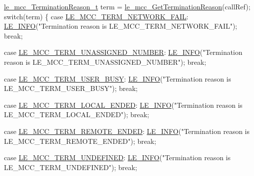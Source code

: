 \begin{DoxyCodeInclude}
{{{{{{{{{{        \hyperlink{le__mcc__interface_8h_abda706f723ba619f9bc460bcc9a4960d}{le\_mcc\_TerminationReason\_t} term = 
      \hyperlink{le__mcc__interface_8h_ab16921abc02e0569b129f4a7d92bf3c9}{le\_mcc\_GetTerminationReason}(callRef);
        \textcolor{keywordflow}{switch}(term)
        \{
            \textcolor{keywordflow}{case} \hyperlink{le__mcc__interface_8h_abda706f723ba619f9bc460bcc9a4960da2ef2a4a77e51faec38a2c131ff5d6f24}{LE\_MCC\_TERM\_NETWORK\_FAIL}:
                \hyperlink{le__log_8h_a23e6d206faa64f612045d688cdde5808}{LE\_INFO}(\textcolor{stringliteral}{"Termination reason is LE\_MCC\_TERM\_NETWORK\_FAIL"});
                \textcolor{keywordflow}{break};

            \textcolor{keywordflow}{case} \hyperlink{le__mcc__interface_8h_abda706f723ba619f9bc460bcc9a4960da2efa341f50cb8abef243d8ea2b9fac7d}{LE\_MCC\_TERM\_UNASSIGNED\_NUMBER}:
                \hyperlink{le__log_8h_a23e6d206faa64f612045d688cdde5808}{LE\_INFO}(\textcolor{stringliteral}{"Termination reason is LE\_MCC\_TERM\_UNASSIGNED\_NUMBER"});
                \textcolor{keywordflow}{break};

            \textcolor{keywordflow}{case} \hyperlink{le__mcc__interface_8h_abda706f723ba619f9bc460bcc9a4960dad7664d1f5a0c6517861637d0a083020c}{LE\_MCC\_TERM\_USER\_BUSY}:
                \hyperlink{le__log_8h_a23e6d206faa64f612045d688cdde5808}{LE\_INFO}(\textcolor{stringliteral}{"Termination reason is LE\_MCC\_TERM\_USER\_BUSY"});
                \textcolor{keywordflow}{break};

            \textcolor{keywordflow}{case} \hyperlink{le__mcc__interface_8h_abda706f723ba619f9bc460bcc9a4960daf4262288191582892e6f84e51e3082c1}{LE\_MCC\_TERM\_LOCAL\_ENDED}:
                \hyperlink{le__log_8h_a23e6d206faa64f612045d688cdde5808}{LE\_INFO}(\textcolor{stringliteral}{"Termination reason is LE\_MCC\_TERM\_LOCAL\_ENDED"});
                \textcolor{keywordflow}{break};

            \textcolor{keywordflow}{case} \hyperlink{le__mcc__interface_8h_abda706f723ba619f9bc460bcc9a4960dad33c3e71bdfd7513392f28bf2a7e9c9b}{LE\_MCC\_TERM\_REMOTE\_ENDED}:
                \hyperlink{le__log_8h_a23e6d206faa64f612045d688cdde5808}{LE\_INFO}(\textcolor{stringliteral}{"Termination reason is LE\_MCC\_TERM\_REMOTE\_ENDED"});
                \textcolor{keywordflow}{break};

            \textcolor{keywordflow}{case} \hyperlink{le__mcc__interface_8h_abda706f723ba619f9bc460bcc9a4960da3dbb90bf0628971a6afbd4773fc97c1a}{LE\_MCC\_TERM\_UNDEFINED}:
                \hyperlink{le__log_8h_a23e6d206faa64f612045d688cdde5808}{LE\_INFO}(\textcolor{stringliteral}{"Termination reason is LE\_MCC\_TERM\_UNDEFINED"});
                \textcolor{keywordflow}{break};

}}}}}}}}}}
\end{DoxyCodeInclude}
